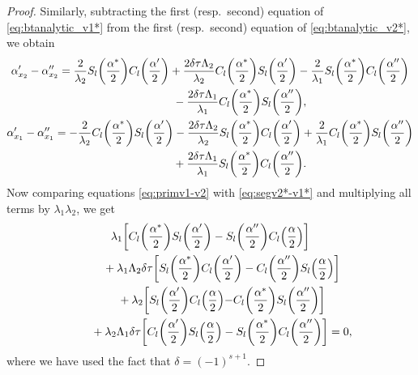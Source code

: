 \documentclass[pdftex]{sigma}
\numberwithin{equation}{section}
\begin{document}
\begin{proof}
Similarly, subtracting the first (resp.\ second) equation of \eqref{eq:btanalytic_v1*} from the first (resp.\ second) equation of \eqref{eq:btanalytic_v2*}, we obtain
\begin{gather}
\alpha'_{x_2}-\alpha''_{x_2} = \frac{2}{\lambda_2}S_{l}\biggl(\frac{\alpha^*}{2}\biggr)C_{l}\biggl(\frac{\alpha'}{2}\biggr)+ \frac{2\delta\tau\Lambda_2}{\lambda_2} C_{l}\biggl(\frac{\alpha^*}{2}\biggr)S_{l}\biggl(\frac{\alpha'}{2}\biggr)-\frac{2}{\lambda_1}S_{l}\biggl(\frac{\alpha^*}{2}\biggr)C_{l}\biggl(\frac{\alpha''}{2}\biggr)
\nonumber\\ \hphantom{\alpha'_{x_2}-\alpha''_{x_2} =}{}
-\frac{2\delta\tau\Lambda_1}{\lambda_1} C_{l}\biggl(\frac{\alpha^*}{2}\biggr)S_{l}\biggl(\frac{\alpha''}{2}\biggr),\label{eq:primv2*-v1*}
\\
\alpha'_{x_1}-\alpha''_{x_1}=
-\frac{2}{\lambda_2}C_{l}\biggl(\frac{\alpha^*}{2}\biggr)S_{l}\biggl(\frac{\alpha'}{2}\biggr)-\frac{2\delta\tau\Lambda_2}{\lambda_2} S_{l}\biggl(\frac{\alpha^*}{2}\biggr)C_{l}\biggl(\frac{\alpha'}{2}\biggr)+\frac{2}{\lambda_1}C_{l}\biggl(\frac{\alpha^*}{2}\biggr)S_{l}\biggl(\frac{\alpha''}{2}\biggr)
\nonumber\\ \hphantom{\alpha'_{x_1}-\alpha''_{x_1}=}{}
+\frac{2\delta\tau\Lambda_1}{\lambda_1} S_{l}\biggl(\frac{\alpha^*}{2}\biggr)C_{l}\biggl(\frac{\alpha''}{2}\biggr). \label{eq:segv2*-v1*}
\end{gather}
Now comparing equations \eqref{eq:primv1-v2} with \eqref{eq:segv2*-v1*} and multiplying all terms by $\lambda_1\lambda_2$, we get
\begin{gather*} %
\lambda_1
\biggl[ C_l\biggl(\frac{\alpha^*}{2}\biggr) S_l\biggl(\frac{\alpha'}{2}\biggr)
-S_l\biggl(\frac{\alpha''}{2}\biggr) C_l\Bigl(\frac{\alpha}{2}\Bigr)\biggr]\\
\qquad{}+\lambda_1\Lambda_2\delta\tau
\biggl[ S_l\biggl(\frac{\alpha^*}{2}\biggr) C_l\biggl(\frac{\alpha'}{2}\biggr)
-C_l\biggl(\frac{\alpha''}{2}\biggr) S_l\Bigl(\frac{\alpha}{2}\Bigr)\biggr] \\
\qquad{}+\lambda_2 \biggl[ S_l\biggl(\frac{\alpha'}{2}\biggr) C_l\Bigl(\frac{\alpha}{2}\Bigl)
 - C_l\biggl(\frac{\alpha^*}{2}\biggr) S_l\biggl(\frac{\alpha''}{2}\biggr) \biggr]\\
 \qquad{}+\lambda_2\Lambda_1\delta\tau \biggl[ C_l\biggl(\frac{\alpha'}{2}\biggr) S_l\Bigl(\frac{\alpha}{2}\Bigr)
 - S_l\biggl(\frac{\alpha^*}{2}\biggr) C_l\biggl(\frac{\alpha''}{2}\biggr) \biggr]=0,
\end{gather*}
where we have used the fact that $\delta=(-1)^{s+1}$.


\end{proof}
\end{document}
